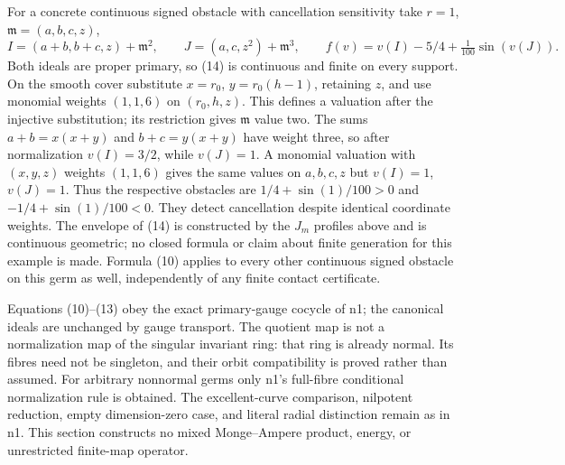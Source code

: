 For a concrete continuous signed obstacle with cancellation sensitivity take $r=1$, $\mathfrak m=(a,b,c,z)$,
\[
 I=(a+b,b+c,z)+\mathfrak m^2,\qquad
 J=(a,c,z^2)+\mathfrak m^3,\qquad
 f(v)=v(I)-5/4+\tfrac1{100}\sin(v(J)). \tag{14}
\]
Both ideals are proper primary, so (14) is continuous and finite on every support. On the smooth cover substitute $x=r_0$, $y=r_0(h-1)$, retaining $z$, and use monomial weights $(1,1,6)$ on $(r_0,h,z)$. This defines a valuation after the injective substitution; its restriction gives $\mathfrak m$ value two. The sums $a+b=x(x+y)$ and $b+c=y(x+y)$ have weight three, so after normalization $v(I)=3/2$, while $v(J)=1$. A monomial valuation with $(x,y,z)$ weights $(1,1,6)$ gives the same values on $a,b,c,z$ but $v(I)=1$, $v(J)=1$. Thus the respective obstacles are $1/4+\sin(1)/100>0$ and $-1/4+\sin(1)/100<0$. They detect cancellation despite identical coordinate weights. The envelope of (14) is constructed by the $J_m$ profiles above and is continuous geometric; no closed formula or claim about finite generation for this example is made. Formula (10) applies to every other continuous signed obstacle on this germ as well, independently of any finite contact certificate.

Equations (10)--(13) obey the exact primary-gauge cocycle of n1; the canonical ideals are unchanged by gauge transport. The quotient map is not a normalization map of the singular invariant ring: that ring is already normal. Its fibres need not be singleton, and their orbit compatibility is proved rather than assumed. For arbitrary nonnormal germs only n1's full-fibre conditional normalization rule is obtained. The excellent-curve comparison, nilpotent reduction, empty dimension-zero case, and literal radial distinction remain as in n1. This section constructs no mixed Monge--Ampere product, energy, or unrestricted finite-map operator.
